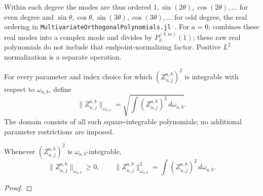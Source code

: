 Within each degree the modes are thus ordered $1,\sin(2\theta),\cos(2\theta),\ldots$
for even degree and $\sin\theta,\cos\theta,\sin(3\theta),\cos(3\theta),\ldots$ for odd
degree, the real ordering in \texttt{MultivariateOrthogonalPolynomials.jl}~\cite{mop-jl}.
For $a=0$, \cite[18.37.1]{dlmf} combines these real modes into a complex mode and
divides by $P_k^{(b,m)}(1)$; these raw real polynomials do not include that
endpoint-normalizing factor. Positive $L^2$ normalization is a separate operation.

\begin{supporting}
\begin{definition}
\label{def:zernike-norm}
\leanok
For every parameter and index choice for which $(Z_{n,j}^{a,b})^2$ is
integrable with respect to $\omega_{a,b}$, define
\[
 \|Z_{n,j}^{a,b}\|_{\omega_{a,b}}=\sqrt{\int (Z_{n,j}^{a,b})^2\,d\omega_{a,b}}.
\]
The domain consists of all such square-integrable polynomials; no additional
parameter restrictions are imposed.
\end{definition}
\begin{theorem}
\label{thm:zernike-norm}
\leanok
Whenever $(Z_{n,j}^{a,b})^2$ is $\omega_{a,b}$-integrable,
\[
 \|Z_{n,j}^{a,b}\|_{\omega_{a,b}}\ge0,\qquad
 \|Z_{n,j}^{a,b}\|_{\omega_{a,b}}^2=\int (Z_{n,j}^{a,b})^2\,d\omega_{a,b}.
\]
\end{theorem}
\begin{proof}
\leanok
\end{proof}
\end{supporting}


